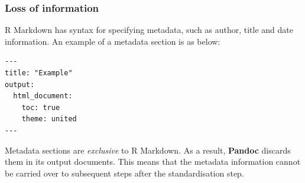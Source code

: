 \documentclass[a4paper, 12pt]{report}
\begin{document}
%
%
%

\subsubsection*{Loss of information}
R Markdown has syntax for specifying metadata, such as author, title and date information. An example of a metadata section is as below:
\begin{lstlisting}[numbers=none, frame=none]
---
title: "Example"
output:
  html_document:
    toc: true
    theme: united
---
\end{lstlisting}

Metadata sections are \emph{exclusive} to R Markdown. As a result, \textbf{Pandoc} discards them in its output documents. This means that the metadata information cannot be carried over to subsequent steps after the standardisation step.


%
%
%
%
\end{document}
